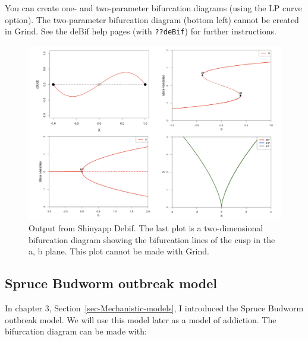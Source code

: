 \documentclass[
  a4paper,
  DIV=11,
  numbers=noendperiod,
  oneside]{scrreprt}
\begin{document}
You can create one- and two-parameter bifurcation diagrams (using the LP
curve option). The two-parameter bifurcation diagram (bottom left)
cannot be created in Grind. See the deBif help pages (with
\texttt{??deBif}) for further instructions.

\begin{figure}

{\centering \includegraphics{media/ch4n/image4.jpg}

}

\caption{\label{fig-ch4n-img4-old-52}Output from Shinyapp Debif. The
last plot is a two-dimensional bifurcation diagram showing the
bifurcation lines of the cusp in the a, b plane. This plot cannot be
made with Grind.}

\end{figure}

\hypertarget{sec-Spruce-Budworm-outbreak-model}{%
\subsection{Spruce Budworm outbreak
model}\label{sec-Spruce-Budworm-outbreak-model}}

In chapter 3, Section~\ref{sec-Mechanistic-models}, I introduced the
Spruce Budworm outbreak model. We will use this model later as a model
of addiction. The bifurcation diagram can be made with:
\end{document}
